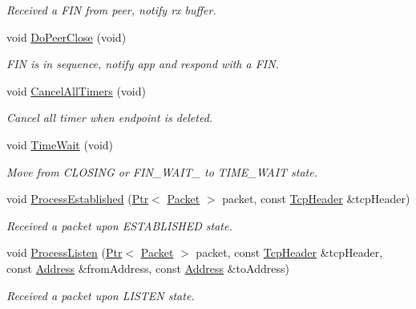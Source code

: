 \begin{DoxyCompactItemize}
\begin{DoxyCompactList}\small\item\em Received a F\+IN from peer, notify rx buffer. \end{DoxyCompactList}\item 
void \hyperlink{classns3_1_1TcpSocketBase_a8a56cf4ab3b64d9f781ed1b1f63f51cd}{Do\+Peer\+Close} (void)
\begin{DoxyCompactList}\small\item\em F\+IN is in sequence, notify app and respond with a F\+IN. \end{DoxyCompactList}\item 
void \hyperlink{classns3_1_1TcpSocketBase_a8dc4de52308fc01262a8c06ae0bcccc5}{Cancel\+All\+Timers} (void)
\begin{DoxyCompactList}\small\item\em Cancel all timer when endpoint is deleted. \end{DoxyCompactList}\item 
void \hyperlink{classns3_1_1TcpSocketBase_acd41dedaf25ea16d290aa5737e303099}{Time\+Wait} (void)
\begin{DoxyCompactList}\small\item\em Move from C\+L\+O\+S\+I\+NG or F\+I\+N\+\_\+\+W\+A\+I\+T\+\_ to T\+I\+M\+E\+\_\+\+W\+A\+IT state. \end{DoxyCompactList}\item 
void \hyperlink{classns3_1_1TcpSocketBase_a0deda9c6a4f777bf660b190cd73b102f}{Process\+Established} (\hyperlink{classns3_1_1Ptr}{Ptr}$<$ \hyperlink{classns3_1_1Packet}{Packet} $>$ packet, const \hyperlink{classns3_1_1TcpHeader}{Tcp\+Header} \&tcp\+Header)
\begin{DoxyCompactList}\small\item\em Received a packet upon E\+S\+T\+A\+B\+L\+I\+S\+H\+ED state. \end{DoxyCompactList}\item 
void \hyperlink{classns3_1_1TcpSocketBase_adc3976e8b42e884f5d99def1d5e2647f}{Process\+Listen} (\hyperlink{classns3_1_1Ptr}{Ptr}$<$ \hyperlink{classns3_1_1Packet}{Packet} $>$ packet, const \hyperlink{classns3_1_1TcpHeader}{Tcp\+Header} \&tcp\+Header, const \hyperlink{classns3_1_1Address}{Address} \&from\+Address, const \hyperlink{classns3_1_1Address}{Address} \&to\+Address)
\begin{DoxyCompactList}\small\item\em Received a packet upon L\+I\+S\+T\+EN state. \end{DoxyCompactList}\item 

\end{DoxyCompactItemize}
